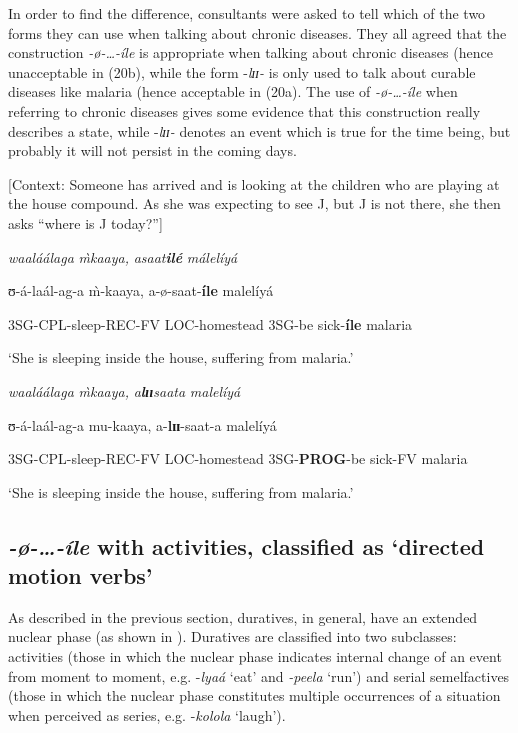\documentclass[output=paper]{langscibook}
\begin{document}
In order to find the difference, consultants were asked to tell which of the two forms they can use when talking about chronic diseases. They all agreed that the construction \textit{-ø}\textit{-…-íle} is appropriate when talking about chronic diseases (hence unacceptable in (20b), while the form -\textit{lɪɪ}\textit{-} is only used to talk about curable diseases like malaria (hence acceptable in (20a). The use of \textit{-ø}\textit{-…-íle} when referring to chronic diseases gives some evidence that this construction really describes a state, while -\textit{lɪɪ}\textit{-} denotes an event which is true for the time being, but probably it will not persist in the coming days. 

\ea{}
[Context: Someone has arrived and is looking at the children who are playing at the house compound. As she was expecting to see J, but J is not there, she then asks “where is J today?”] 

\ea *\textit{waaláálaga}                  \textit{\`{m}}\textit{kaaya,}              \textit{asaat}\textbf{\textit{ilé}}           \textit{málelíyá}


       ʊ-á-laál-ag-a                \`{m}-kaaya,            a-ø-saat-\textbf{íle}      malelíyá

       3SG-CPL-sleep-REC-FV LOC-homestead 3SG-be sick-\textbf{íle} malaria

       ‘She is sleeping inside the house, suffering from malaria.’


 \ex \textit{waaláálaga}                \textit{\`{m}}\textit{kaaya,}         \textit{a}\textbf{\textit{l}}\textbf{\textit{ɪɪ}}\textit{saata}                   \textit{malelíyá}


      ʊ-á-laál-ag-a             mu-kaaya,      a-\textbf{lɪɪ}-saat-a                malelíyá

       3SG-CPL-sleep-REC-FV LOC-homestead 3SG-\textbf{PROG}-be sick-FV malaria

      ‘She is sleeping inside the house, suffering from malaria.’
\z
\z

\subsection{\textit{-}\textit{ø-…-íle} with activities, classified as ‘directed motion verbs’}

As described in the previous section, duratives, in general, have an extended nuclear phase (as shown in ). Duratives are classified into two subclasses: activities (those in which the nuclear phase indicates internal change of an event from moment to moment, e.g. -\textit{lyaá} ‘eat’ and \textit{-peela} ‘run’) and serial semelfactives (those in which the nuclear phase constitutes multiple occurrences of a situation when perceived as series, e.g. -\textit{kolola} ‘laugh’). 
\end{document}
